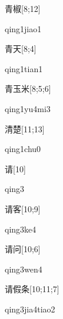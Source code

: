 \begin{verbete}{青椒}[8;12]
\begin{pronuncia}{qing1jiao1}
\end{pronuncia}
\end{verbete}

\begin{verbete}{青天}[8;4]
\begin{pronuncia}{qing1tian1}
\end{pronuncia}
\end{verbete}

\begin{verbete}[qing1yu4mi3]{青玉米}[8;5;6]
\begin{pronuncia}{qing1yu4mi3}
\end{pronuncia}
\end{verbete}

\begin{verbete}{清楚}[11;13]
\begin{pronuncia}{qing1chu0}
\end{pronuncia}
\end{verbete}

\begin{verbete}[qing3]{请}[10]
\begin{pronuncia}{qing3}
\end{pronuncia}
\end{verbete}

\begin{verbete}[qing3ke4]{请客}[10;9]
\begin{pronuncia}{qing3ke4}
\end{pronuncia}
\end{verbete}

\begin{verbete}{请问}[10;6]
\begin{pronuncia}{qing3wen4}
\end{pronuncia}
\end{verbete}

\begin{verbete}{请假条}[10;11;7]
\begin{pronuncia}{qing3jia4tiao2}
\end{pronuncia}
\end{verbete}

